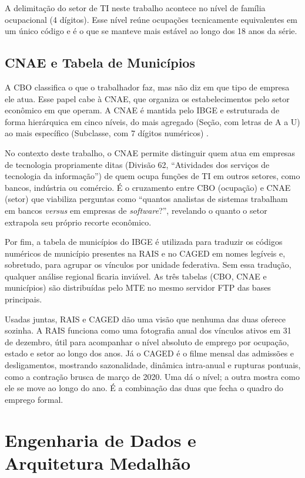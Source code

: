 A delimitação do setor de TI neste trabalho acontece no nível de família ocupacional (4 dígitos). Esse nível reúne ocupações tecnicamente equivalentes em um único código e é o que se manteve mais estável ao longo dos 18 anos da série.

\subsection{CNAE e Tabela de Municípios}

A CBO classifica o que o trabalhador faz, mas não diz em que tipo de empresa ele atua. Esse papel cabe à CNAE, que organiza os estabelecimentos pelo setor econômico em que operam. A CNAE é mantida pelo IBGE e estruturada de forma hierárquica em cinco níveis, do mais agregado (Seção, com letras de A a U) ao mais específico (Subclasse, com 7 dígitos numéricos) \cite{CNAE2024}.

No contexto deste trabalho, o CNAE permite distinguir quem atua em empresas de tecnologia propriamente ditas (Divisão 62, ``Atividades dos serviços de tecnologia da informação'') de quem ocupa funções de TI em outros setores, como bancos, indústria ou comércio. É o cruzamento entre CBO (ocupação) e CNAE (setor) que viabiliza perguntas como ``quantos analistas de sistemas trabalham em bancos \textit{versus} em empresas de \textit{software}?'', revelando o quanto o setor extrapola seu próprio recorte econômico.

Por fim, a tabela de municípios do IBGE é utilizada para traduzir os códigos numéricos de município presentes na RAIS e no CAGED em nomes legíveis e, sobretudo, para agrupar os vínculos por unidade federativa. Sem essa tradução, qualquer análise regional ficaria inviável. As três tabelas (CBO, CNAE e municípios) são distribuídas pelo MTE no mesmo servidor FTP das bases principais.

Usadas juntas, RAIS e CAGED dão uma visão que nenhuma das duas oferece sozinha. A RAIS funciona como uma fotografia anual dos vínculos ativos em 31 de dezembro, útil para acompanhar o nível absoluto de emprego por ocupação, estado e setor ao longo dos anos. Já o CAGED é o filme mensal das admissões e desligamentos, mostrando sazonalidade, dinâmica intra-anual e rupturas pontuais, como a contração brusca de março de 2020. Uma dá o nível; a outra mostra como ele se move ao longo do ano. É a combinação das duas que fecha o quadro do emprego formal.

\section{Engenharia de Dados e Arquitetura Medalhão}


